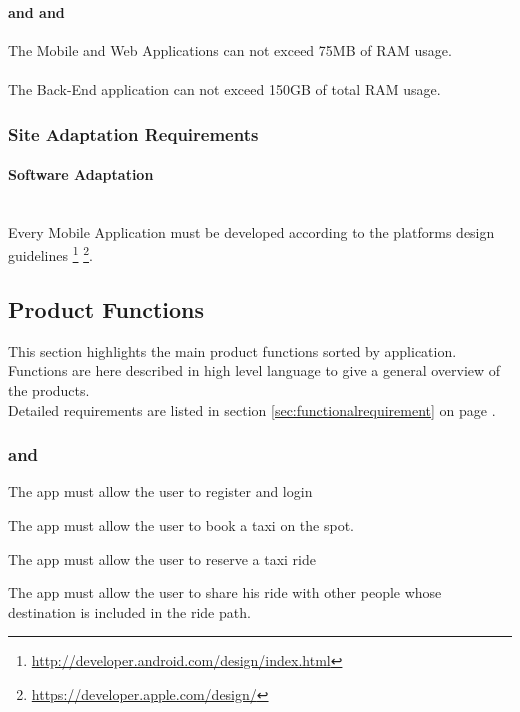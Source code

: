 \label{ssub:memory_constrains}
\paragraph{ and  and  }
The Mobile and Web Applications can not exceed 75MB of RAM usage.
\paragraph{}
The Back-End application can not exceed 150GB of total RAM usage.

\subsubsection{Site Adaptation Requirements} 
\label{ssub:site_adaptation_requirements}
\paragraph{Software Adaptation} \mbox{} \\
Every Mobile Application must be developed according to the platforms design guidelines \footnote{\url{http://developer.android.com/design/index.html}} \footnote{\url{https://developer.apple.com/design/}}.

\subsection{Product Functions} 
\label{sub:product_functions}
This section highlights the main product functions sorted by application.\\
Functions are here described in high level language to give a general overview of the products.\\
Detailed requirements are listed in section \ref{sec:functionalrequirement} on page \pageref{sec:functionalrequirement}.

\subsubsection{ and }
\label{ssub:web_application_and_mobile_application_}
\begin{enumerate} [label = \textbf{[F\arabic*]}]
	\item The app must allow the user to register and login
	\item  The app must allow the user to book a taxi on the spot.
	\item  The app must allow the user to reserve a taxi ride
	\item  The app must allow the user to share his ride with other people whose destination is included in the ride path.
\end{enumerate}

